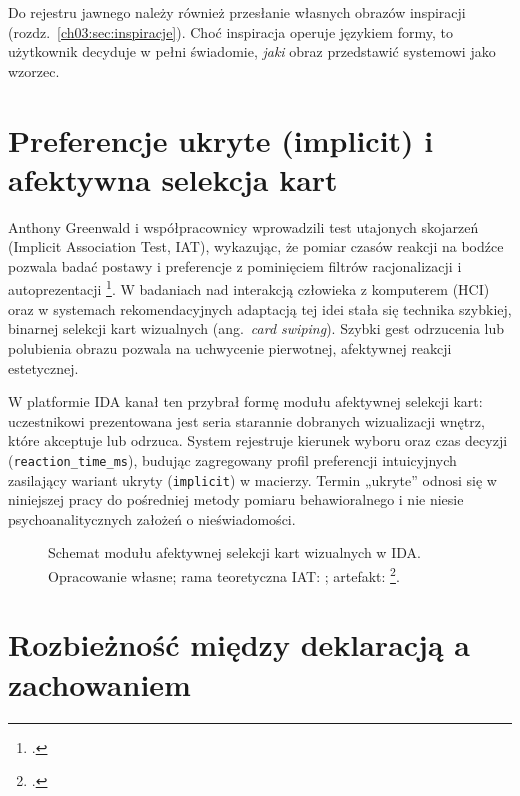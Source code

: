 Do rejestru jawnego należy również przesłanie własnych obrazów inspiracji (rozdz.~\ref{ch03:sec:inspiracje}). Choć inspiracja operuje językiem formy, to użytkownik decyduje w pełni świadomie, \emph{jaki} obraz przedstawić systemowi jako wzorzec.

\section{Preferencje ukryte (implicit) i afektywna selekcja kart}
\label{ch03:sec:implicit}

Anthony Greenwald i współpracownicy wprowadzili test utajonych skojarzeń (Implicit Association Test, IAT), wykazując, że pomiar czasów reakcji na bodźce pozwala badać postawy i preferencje z pominięciem filtrów racjonalizacji i autoprezentacji \footcite{greenwald1998iat}.
W badaniach nad interakcją człowieka z komputerem (HCI) oraz w systemach rekomendacyjnych adaptacją tej idei stała się technika szybkiej, binarnej selekcji kart wizualnych (ang.\ \emph{card swiping}). Szybki gest odrzucenia lub polubienia obrazu pozwala na uchwycenie pierwotnej, afektywnej reakcji estetycznej.

W platformie IDA kanał ten przybrał formę modułu afektywnej selekcji kart: uczestnikowi prezentowana jest seria starannie dobranych wizualizacji wnętrz, które akceptuje lub odrzuca. System rejestruje kierunek wyboru oraz czas decyzji (\texttt{reaction\_time\_ms}), budując zagregowany profil preferencji intuicyjnych zasilający wariant ukryty (\texttt{implicit}) w macierzy.
Termin „ukryte” odnosi się w niniejszej pracy do pośredniej metody pomiaru behawioralnego i nie niesie psychoanalitycznych założeń o nieświadomości.

\begin{figure}[htbp]
  \centering
  \caption[Schemat modułu afektywnej selekcji kart wizualnych w IDA. Opracowanie własne; rama teoretyczna IAT: Greenwald, McGhee i Schwartz; artefakt IDA.]{Schemat modułu afektywnej selekcji kart wizualnych w IDA.
    Opracowanie własne; rama teoretyczna IAT: \textcite{greenwald1998iat}; artefakt: \footcite{idaPlatform2026}.}
  \label{fig:ch03:tinder-iat}
\end{figure}

\section{Rozbieżność między deklaracją a zachowaniem}
\label{ch03:sec:rozbieznosci}

